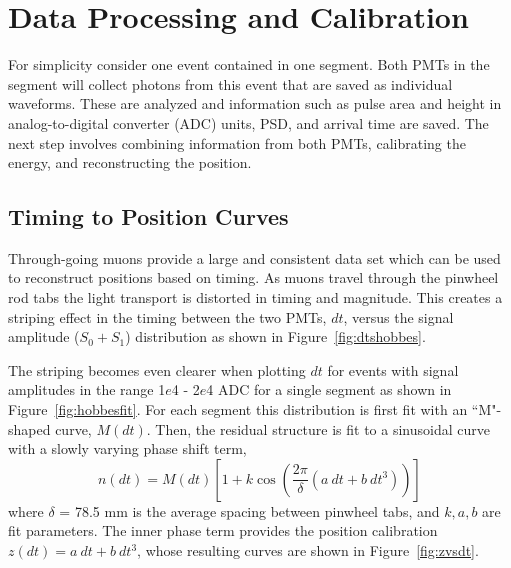 \section{Data Processing and Calibration}

For simplicity consider one event contained in one segment. 
Both PMTs in the segment will collect photons from this event that are saved as individual waveforms. 
These are analyzed and information such as pulse area and height in analog-to-digital converter (ADC) units, PSD, and arrival time are saved. 
The next step involves combining information from both PMTs, calibrating the energy, and reconstructing the position. 


\subsection{Timing to Position Curves}

Through-going muons provide a large and consistent data set which can be used to reconstruct positions based on timing.
As muons travel through the pinwheel rod tabs the light transport is distorted in timing and magnitude. 
This creates a striping effect in the timing between the two PMTs, $dt$, versus the signal amplitude ($S_0 + S_1$) distribution as shown in Figure~\ref{fig:dtshobbes}.

The striping becomes even clearer when plotting $dt$ for events with signal amplitudes in the range  1$e$4 -  2$e$4 ADC for a single segment as shown in Figure~\ref{fig:hobbesfit}.
For each segment this distribution is first fit with an ``M"-shaped curve, $M(dt)$. 
Then, the residual structure is fit to a sinusoidal curve with a slowly varying phase shift term,
\begin{equation}
	n(dt) = M(dt)\left[1 + k\cos\left(\frac{2\pi}{\delta}\left(a~dt + b~dt^3\right)\right)\right]
\end{equation}
where $\delta$ = 78.5 mm is the average spacing between pinwheel tabs, and $k, a, b$ are fit parameters.
The inner phase term provides the position calibration $z(dt) = a~dt + b~dt^3$, whose resulting curves are shown in Figure~\ref{fig:zvsdt}.

